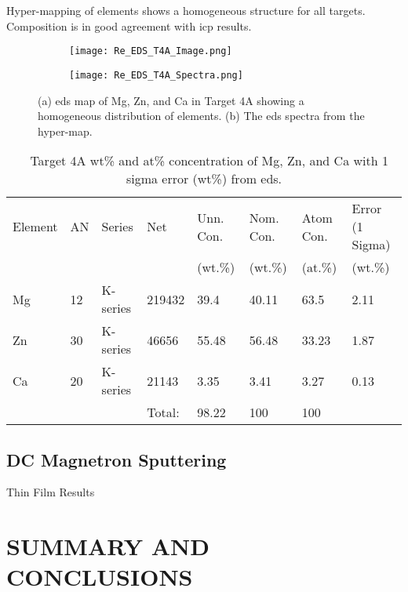 \documentclass[a4paper,12pt,oneside]{report}%
\begin{document}
Hyper-mapping of elements shows a homogeneous structure for all targets. Composition is in good agreement with \gls{icp} results.

\begin{figure}[htbp]
	\centering
	\begin{subfigure}[htbp]{0.49\textwidth}
		\texttt{[image: Re\_EDS\_T4A\_Image.png]}
		\caption{}
		\label{fig:EDST4A_Micro}
	\end{subfigure}
	\begin{subfigure}[htbp]{0.49\textwidth}
		\texttt{[image: Re\_EDS\_T4A\_Spectra.png]}
		\caption{}
		\label{fig:EDST4A_Spectra}
	\end{subfigure}
	\caption{(a) \acrshort{eds} map of Mg, Zn, and Ca in Target 4A showing a homogeneous distribution of elements. (b) The \acrshort{eds} spectra from the hyper-map.}%
	\label{fig:EDST4A}
\end{figure}

\begin{table}[H]
	\centering
	\begin{tabular}{llllllll}
		\toprule
		Element & AN & Series & Net & Unn. Con. & Nom. Con. & Atom Con. & Error (1 Sigma)\\
		& & & & (wt.\%) & (wt.\%) & (at.\%) & (wt.\%) \\
		\midrule
		Mg & 12 & K-series & 219432 & 39.4 & 40.11 & 63.5 & 2.11 \\
		Zn & 30 & K-series & 46656  & 55.48  & 56.48  & 33.23 & 1.87  \\
		Ca & 20 & K-series & 21143  & 3.35 & 3.41  & 3.27 & 0.13  \\
		&  &    & Total:   & 98.22 & 100  & 100  & \\
		\bottomrule                
	\end{tabular}
	\caption{\MgZnCa~ Target 4A wt\% and at\% concentration of Mg, Zn, and Ca with 1 sigma error (wt\%) from \acrshort{eds}.}
	\label{tab:EDST4Tabel}
\end{table}

\section{DC Magnetron Sputtering}
Thin Film Results


\chapter{SUMMARY AND CONCLUSIONS}
\glsresetall
\end{document}
